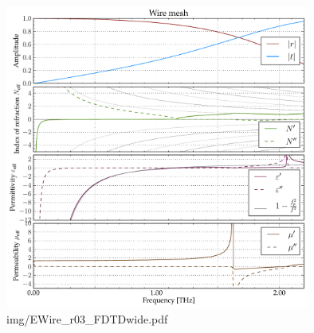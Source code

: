 \begin{figure} \caption{img/EWire\_r03\_FDTDwide.pdf}  \centering \includegraphics[width=10cm]{img/EWire_r03_FDTDwide.pdf} \end{figure} \clearpage

